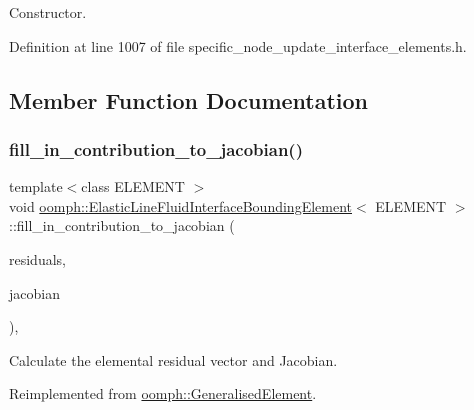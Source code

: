 Constructor. 



Definition at line 1007 of file specific\+\_\+node\+\_\+update\+\_\+interface\+\_\+elements.\+h.



\subsection{Member Function Documentation}
\mbox{\label{classoomph_1_1ElasticLineFluidInterfaceBoundingElement_a71b23e3ad49d5137ca4a7f654f828077}} 
\subsubsection{\texorpdfstring{fill\+\_\+in\+\_\+contribution\+\_\+to\+\_\+jacobian()}{fill\_in\_contribution\_to\_jacobian()}}
{\footnotesize\ttfamily template$<$class E\+L\+E\+M\+E\+NT $>$ \\
void \hyperlink{classoomph_1_1ElasticLineFluidInterfaceBoundingElement}{oomph\+::\+Elastic\+Line\+Fluid\+Interface\+Bounding\+Element}$<$ E\+L\+E\+M\+E\+NT $>$\+::fill\+\_\+in\+\_\+contribution\+\_\+to\+\_\+jacobian (\begin{DoxyParamCaption}\item[{\hyperlink{classoomph_1_1Vector}{Vector}$<$ double $>$ \&}]{residuals,  }\item[{\hyperlink{classoomph_1_1DenseMatrix}{Dense\+Matrix}$<$ double $>$ \&}]{jacobian }\end{DoxyParamCaption})\hspace{0.3cm}{\ttfamily [inline]}, {\ttfamily [virtual]}}



Calculate the elemental residual vector and Jacobian. 



Reimplemented from \hyperlink{classoomph_1_1GeneralisedElement_a6ae09fc0d68e4309ac1b03583d252845}{oomph\+::\+Generalised\+Element}.



